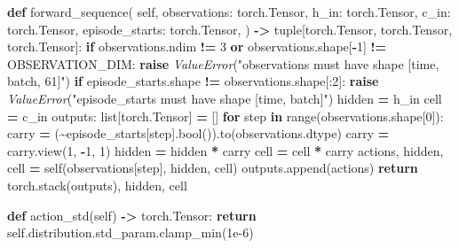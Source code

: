 \documentclass[
  american,
  11pt,
  letterpaper,
]{article}
\newenvironment{Shaded}{\begin{snugshade}}{\end{snugshade}}
\newcommand{\BuiltInTok}[1]{#1}
\newcommand{\ControlFlowTok}[1]{\textcolor[rgb]{0.13,0.29,0.53}{\textbf{#1}}}
\newcommand{\DecValTok}[1]{\textcolor[rgb]{0.00,0.00,0.81}{#1}}
\newcommand{\FloatTok}[1]{\textcolor[rgb]{0.00,0.00,0.81}{#1}}
\newcommand{\KeywordTok}[1]{\textcolor[rgb]{0.13,0.29,0.53}{\textbf{#1}}}
\newcommand{\NormalTok}[1]{#1}
\newcommand{\OperatorTok}[1]{\textcolor[rgb]{0.81,0.36,0.00}{\textbf{#1}}}
\newcommand{\PreprocessorTok}[1]{\textcolor[rgb]{0.56,0.35,0.01}{\textit{#1}}}
\newcommand{\StringTok}[1]{\textcolor[rgb]{0.31,0.60,0.02}{#1}}
\newcommand{\VariableTok}[1]{\textcolor[rgb]{0.00,0.00,0.00}{#1}}
\renewenvironment{Shaded}{\par\smallskip}{\par\smallskip}
\begin{document}
\begin{Shaded}
\begin{Highlighting}[]
    \KeywordTok{def}\NormalTok{ forward\_sequence(}
        \VariableTok{self}\NormalTok{,}
\NormalTok{        observations: torch.Tensor,}
\NormalTok{        h\_in: torch.Tensor,}
\NormalTok{        c\_in: torch.Tensor,}
\NormalTok{        episode\_starts: torch.Tensor,}
\NormalTok{    ) }\OperatorTok{{-}\textgreater{}} \BuiltInTok{tuple}\NormalTok{[torch.Tensor, torch.Tensor, torch.Tensor]:}
        \ControlFlowTok{if}\NormalTok{ observations.ndim }\OperatorTok{!=} \DecValTok{3} \KeywordTok{or}\NormalTok{ observations.shape[}\OperatorTok{{-}}\DecValTok{1}\NormalTok{] }\OperatorTok{!=}\NormalTok{ OBSERVATION\_DIM:}
            \ControlFlowTok{raise} \PreprocessorTok{ValueError}\NormalTok{(}\StringTok{"observations must have shape [time, batch, 61]"}\NormalTok{)}
        \ControlFlowTok{if}\NormalTok{ episode\_starts.shape }\OperatorTok{!=}\NormalTok{ observations.shape[:}\DecValTok{2}\NormalTok{]:}
            \ControlFlowTok{raise} \PreprocessorTok{ValueError}\NormalTok{(}\StringTok{"episode\_starts must have shape [time, batch]"}\NormalTok{)}
\NormalTok{        hidden }\OperatorTok{=}\NormalTok{ h\_in}
\NormalTok{        cell }\OperatorTok{=}\NormalTok{ c\_in}
\NormalTok{        outputs: }\BuiltInTok{list}\NormalTok{[torch.Tensor] }\OperatorTok{=}\NormalTok{ []}
        \ControlFlowTok{for}\NormalTok{ step }\KeywordTok{in} \BuiltInTok{range}\NormalTok{(observations.shape[}\DecValTok{0}\NormalTok{]):}
\NormalTok{            carry }\OperatorTok{=}\NormalTok{ (}\OperatorTok{\textasciitilde{}}\NormalTok{episode\_starts[step].}\BuiltInTok{bool}\NormalTok{()).to(observations.dtype)}
\NormalTok{            carry }\OperatorTok{=}\NormalTok{ carry.view(}\DecValTok{1}\NormalTok{, }\OperatorTok{{-}}\DecValTok{1}\NormalTok{, }\DecValTok{1}\NormalTok{)}
\NormalTok{            hidden }\OperatorTok{=}\NormalTok{ hidden }\OperatorTok{*}\NormalTok{ carry}
\NormalTok{            cell }\OperatorTok{=}\NormalTok{ cell }\OperatorTok{*}\NormalTok{ carry}
\NormalTok{            actions, hidden, cell }\OperatorTok{=} \VariableTok{self}\NormalTok{(observations[step], hidden, cell)}
\NormalTok{            outputs.append(actions)}
        \ControlFlowTok{return}\NormalTok{ torch.stack(outputs), hidden, cell}

    \KeywordTok{def}\NormalTok{ action\_std(}\VariableTok{self}\NormalTok{) }\OperatorTok{{-}\textgreater{}}\NormalTok{ torch.Tensor:}
        \ControlFlowTok{return} \VariableTok{self}\NormalTok{.distribution.std\_param.clamp\_min(}\FloatTok{1e{-}6}\NormalTok{)}



\end{Highlighting}
\end{Shaded}
\end{document}
